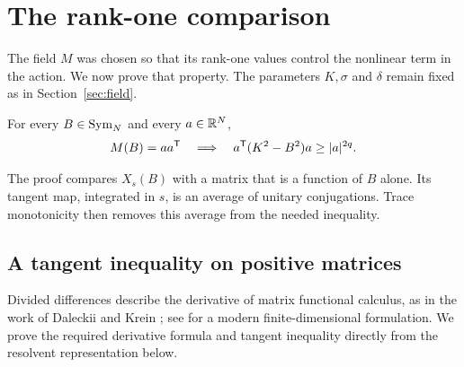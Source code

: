 \section{The rank-one comparison}\label{sec:rankone}

The field $M$ was chosen so that its rank-one values control the nonlinear
term in the action. We now prove that property. The parameters $K,\sigma$
and $\delta$ remain fixed as in Section~\ref{sec:field}.

\begin{proposition}\label{prop:rankone}
For every $B\in\operatorname{Sym}_N$ and every $a\in\mathbb R^N$,
\begin{equation}\label{eq:rankone}
 M(B)=aa^{\mathsf T}\quad\Longrightarrow\quad
 a^{\mathsf T}(K^2-B^2)a\ge |a|^{2q}.
\end{equation}
\end{proposition}

The proof compares $X_s(B)$ with a matrix that is a function of $B$ alone.
Its tangent map, integrated in $s$, is an average of unitary conjugations.
Trace monotonicity then removes this average from the needed inequality.

\subsection{A tangent inequality on positive matrices}

Divided differences describe the derivative of matrix functional calculus,
as in the work of Daleckii and Krein \cite{DaleckiiKrein1965}; see
\cite[Theorem~2.3.1]{Hiai2010} for a modern finite-dimensional formulation.
We prove the required derivative formula and tangent inequality directly
from the resolvent representation below.


